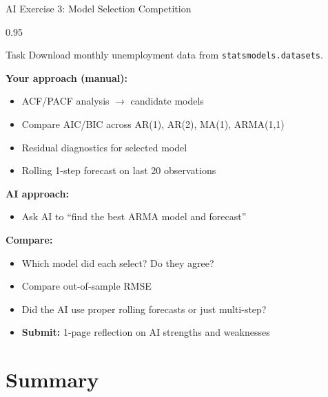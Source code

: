 \documentclass[9pt, aspectratio=169, t]{beamer}
\begin{document}
\begin{frame}{AI Exercise 3: Model Selection Competition}
    \begin{cminipage}{0.95\textwidth}
    \begin{block}{Task}
        Download monthly unemployment data from \texttt{statsmodels.datasets}.
    \end{block}

    \vspace{0.1cm}

    {\footnotesize
    \textbf{Your approach (manual):}
    \begin{itemize}\setlength{\itemsep}{0pt}
        \item ACF/PACF analysis $\to$ candidate models
        \item Compare AIC/BIC across AR(1), AR(2), MA(1), ARMA(1,1)
        \item Residual diagnostics for selected model
        \item Rolling 1-step forecast on last 20 observations
    \end{itemize}

    \textbf{AI approach:}
    \begin{itemize}\setlength{\itemsep}{0pt}
        \item Ask AI to ``find the best ARMA model and forecast''
    \end{itemize}

    \textbf{Compare:}
    \begin{itemize}\setlength{\itemsep}{0pt}
        \item Which model did each select? Do they agree?
        \item Compare out-of-sample RMSE
        \item Did the AI use proper rolling forecasts or just multi-step?
        \item \textbf{Submit:} 1-page reflection on AI strengths and weaknesses
    \end{itemize}
    }
    \end{cminipage}
\end{frame}

\section{Summary}
\end{document}
